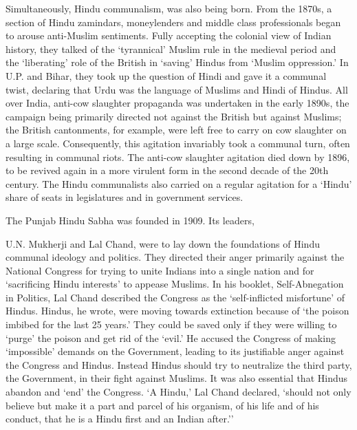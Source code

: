 \begin{multicols}{2}
Simultaneously, Hindu communalism, was also being born. From the 1870s, a section of Hindu zamindars, moneylenders and middle class professionals began to arouse anti-Muslim sentiments. Fully accepting the colonial view of Indian history, they talked of the `tyrannical' Muslim rule in the medieval period and the `liberating' role of the British in `saving' Hindus from `Muslim oppression.' In U.P. and Bihar, they took up the question of Hindi and gave it a communal twist, declaring that Urdu was the language of Muslims and Hindi of Hindus. All over India, anti-cow slaughter propaganda was undertaken in the early 1890s, the campaign being primarily directed not against the British but against Muslims; the British cantonments, for example, were left free to carry on cow slaughter on a large scale. Consequently, this agitation invariably took a communal turn, often resulting in communal riots. The anti-cow slaughter agitation died down by 1896, to be revived again in a more virulent form in the second decade of the 20th century. The Hindu communalists also carried on a regular agitation for a `Hindu' share of seats in legislatures and in government services. 

The Punjab Hindu Sabha was founded in 1909. Its leaders, 

U.N. Mukherji and Lal Chand, were to lay down the foundations of Hindu communal ideology and politics. They directed their anger primarily against the National Congress for trying to unite Indians into a single nation and for `sacrificing Hindu interests' to appease Muslims. In his booklet, Self-Abnegation in Politics, Lal Chand described the Congress as the `self-inflicted misfortune' of Hindus. Hindus, he wrote, were moving towards extinction because of `the poison imbibed for the last 25 years.' They could be saved only if they were willing to `purge' the poison and get rid of the `evil.' He accused the Congress of making `impossible' demands on the Government, leading to its justifiable anger against the Congress and Hindus. Instead Hindus should try to neutralize the third party, the Government, in their fight against Muslims. It was also essential that Hindus abandon and `end' the Congress. `A Hindu,' Lal Chand declared, `should not only believe but make it a part and parcel of his organism, of his life and of his conduct, that he is a Hindu first and an Indian after.'' 


\end{multicols}
